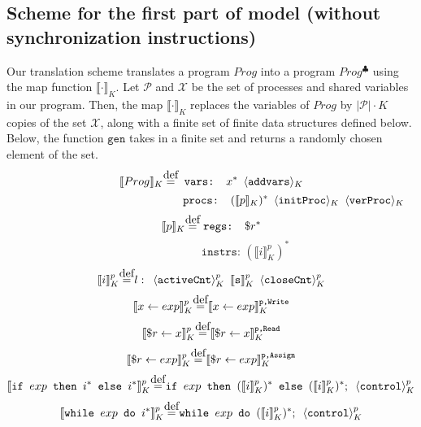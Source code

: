 \documentclass{article}
\newcommand\myeq{\stackrel{\mathclap{\normalfont\mbox{def}}}{=}}
\begin{document}
\subsection{Scheme for the first part of model (without synchronization instructions)}
Our translation scheme translates a program $Prog$ into a program $Prog^\clubsuit$ using the map function $\llbracket\cdot\rrbracket_K$. Let $\mathcal{P}$ and $\mathcal{X}$ be the set of processes and shared variables in our program. Then, the map $\llbracket\cdot\rrbracket_K$ replaces the variables of $Prog$ by $|\mathcal{P}|\cdot K$ copies of the set $\mathcal{X}$, along with a finite set of finite data structures defined below. Below, the function $\texttt{gen}$ takes in a finite set and returns a randomly chosen element of the set.\\
$$\llbracket Prog \rrbracket_K \myeq \texttt{ vars: }x^* \hspace{0.5em} \langle \texttt{addvars} \rangle_K$$
\vspace{-2em}
$$\qquad\qquad\qquad\qquad\kern 6.5em\texttt{procs: }(\llbracket p \rrbracket_K)^* \kern 0.5em \langle \texttt{initProc} \rangle_K \kern 0.5em \langle \texttt{verProc} \rangle_K$$
$$\llbracket p \rrbracket_K \myeq \;\texttt{regs: } \$r^*$$
\vspace{-2em}
$$\qquad\qquad\qquad\texttt{instrs: } (\llbracket i \rrbracket_K^p)^*$$
$$\llbracket i \rrbracket_K^p \myeq l: \kern 0.5em \langle \texttt{activeCnt} \rangle_K^p \kern 0.5em \llbracket \texttt{s} \rrbracket_K^p \kern 0.5em \langle \texttt{closeCnt} \rangle_K^p$$
$$\llbracket x \leftarrow exp \rrbracket_K^p \myeq \llbracket x \leftarrow exp \rrbracket_K^\texttt{p,Write}$$ 
\vspace{-1.2em}
$$\llbracket \$r \leftarrow x \rrbracket_K^p \myeq \llbracket \$r \leftarrow x \rrbracket_K^\texttt{p,Read}$$
\vspace{-1.2em}
$$\llbracket \$r \leftarrow exp \rrbracket_K^p \myeq \llbracket \$r \leftarrow exp \rrbracket_K^\texttt{p,Assign} $$
\vspace{-1.2em}
$$\llbracket \texttt{if } exp \texttt{ then }i^* \texttt{ else }i^* \rrbracket_K^p \myeq \texttt{if } exp \texttt{ then } (\llbracket i  \rrbracket_K^p)^* \texttt{ else } (\llbracket i \rrbracket_K^p)^*; \kern 0.5em \langle \texttt{control} \rangle_K^p$$
\vspace{-1.2em}
$$\llbracket \texttt{while } exp \texttt{ do }i^* \rrbracket_K^p \myeq \texttt{while } exp \texttt{ do } (\llbracket i \rrbracket_K^p)^*; \kern 0.5em \langle \texttt{control} \rangle_K^p$$
\vspace{-1.2em}
\end{document}
